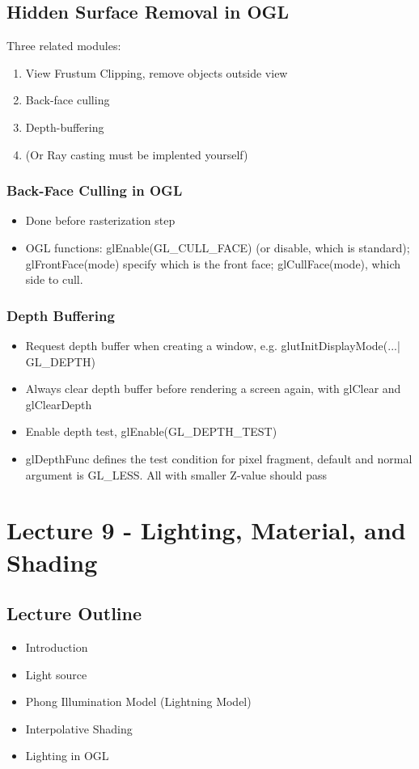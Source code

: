 \documentclass[11pt]{article}
\begin{document}
\subsection{Hidden Surface Removal in OGL}
Three related modules:
\begin{enumerate}
    \item View Frustum Clipping, remove objects outside view
    \item Back-face culling
    \item Depth-buffering
    \item (Or Ray casting must be implented yourself)
\end{enumerate}

\subsubsection*{Back-Face Culling in OGL}
\begin{itemize}
    \item Done before rasterization step
    \item OGL functions: glEnable(GL\_CULL\_FACE) (or disable, which is standard); glFrontFace(mode) specify which is the front face; glCullFace(mode), which side to cull.
\end{itemize}

\subsubsection*{Depth Buffering}
\begin{itemize}
    \item Request depth buffer when creating a window, e.g. glutInitDisplayMode(...| GL\_DEPTH)
    \item Always clear depth buffer before rendering a screen again, with glClear and glClearDepth
    \item Enable depth test, glEnable(GL\_DEPTH\_TEST)
    \item glDepthFunc defines the test condition for pixel fragment, default and normal argument is GL\_LESS. All with smaller Z-value should pass
\end{itemize}


\section{Lecture 9 - Lighting, Material, and Shading}
\subsection*{Lecture Outline}
\begin{itemize}
    \item Introduction
    \item Light source
    \item Phong Illumination Model (Lightning Model)
    \item Interpolative Shading
    \item Lighting in OGL
\end{itemize}
\end{document}
